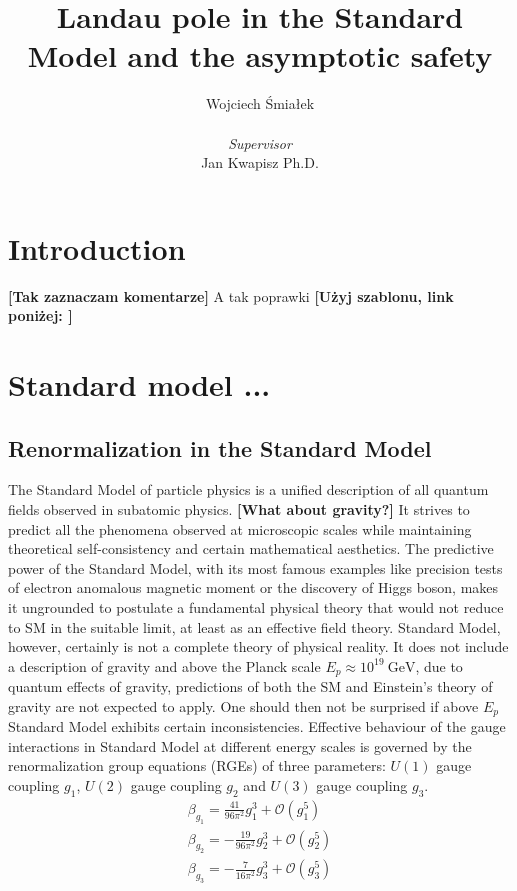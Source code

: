\documentclass[11pt, a4paper]{article}
\title{\vspace{-2cm}Landau pole in the Standard Model and the asymptotic safety}
\author{{Wojciech Śmiałek}\\
\\
{\textit{Supervisor}} \\
{Jan Kwapisz Ph.D.}}
\date{}
\newcommand{\jhk}[1]{{\color{red}#1}}
\newcommand{\jhkbf}[1]{\textbf{\color{red} [#1]}}
\begin{document}
\maketitle

\section{Introduction}
\jhkbf{Tak zaznaczam komentarze}
\jhk{A tak poprawki}
\jhkbf{Użyj szablonu, link poniżej: }


\section{Standard model ...}
\subsection{Renormalization in the Standard Model}
The Standard Model of particle physics is a unified description of all quantum fields observed in subatomic physics.  \jhkbf{What about gravity?}
It strives to predict all the phenomena observed at microscopic scales while maintaining theoretical
self-consistency and certain mathematical aesthetics. The predictive power of the Standard Model, with its most
famous examples like precision tests of electron anomalous magnetic moment or the discovery of Higgs boson,
makes it ungrounded to postulate a fundamental physical theory that would not reduce to SM in the suitable limit, at least
as an effective field theory.
Standard Model, however, certainly is not a complete theory of physical reality. It does not include a description
of gravity and above the Planck scale $E_p \approx 10^{19} \ \text{GeV}$, due to quantum effects of gravity,
predictions of both the SM and Einstein's theory of gravity are not expected to apply.
One should then not be surprised if above $E_p$ Standard Model exhibits certain inconsistencies.
Effective behaviour of the gauge interactions in Standard Model at different energy scales is governed by the renormalization group equations (RGEs) of three parameters: $U(1)$ gauge coupling $g_1$, $U(2)$ gauge coupling $g_2$ and $U(3)$ gauge coupling $g_3$.
\begin{gather}
   \beta_{g_1} = \frac{41}{96\pi^2} g_1^3 + \mathcal{O}(g_1^5) \\%
    \beta_{g_2} = - \frac{19}{96\pi^2} g_2^3  + \mathcal{O}(g_2^5)\\
    \beta_{g_3} = - \frac{7}{16\pi^2} g_3^3 + \mathcal{O}(g_3^5) \\
\end{gather}
\end{document}
